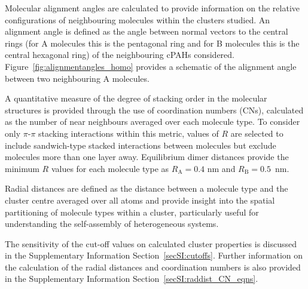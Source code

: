 
Molecular alignment angles are calculated to provide information on the relative configurations of neighbouring molecules within the clusters studied. An alignment angle is defined as the angle between normal vectors to the central rings (for A molecules this is the pentagonal ring and for B molecules this is the central hexagonal ring) of the neighbouring cPAHs considered.  Figure~\ref{fig:alignmentangles_homo} provides a schematic of the alignment angle between two neighbouring A molecules.

A quantitative measure of the degree of stacking order in the molecular structures is provided through the use of coordination numbers (CNs), calculated as the number of near neighbours averaged over each molecule type. To consider only $\pi$-$\pi$ stacking interactions within this metric, values of $R$ are selected to include sandwich-type stacked interactions between molecules but exclude molecules more than one layer away. Equilibrium dimer distances provide the minimum $R$ values for each molecule type as $R_{\text{A}} = 0.4$ nm and $R_{\text{B}} = 0.5$~nm.

Radial distances are defined as the distance between a molecule type and the cluster centre averaged over all atoms and provide insight into the spatial partitioning of molecule types within a cluster, particularly useful for understanding the self-assembly of heterogeneous systems.

The sensitivity of the cut-off values on calculated cluster properties is discussed in the Supplementary Information Section~\ref{secSI:cutoffs}. Further information on the calculation of the radial distances and coordination numbers is also provided in the Supplementary Information Section~\ref{secSI:raddist_CN_eqns}.




